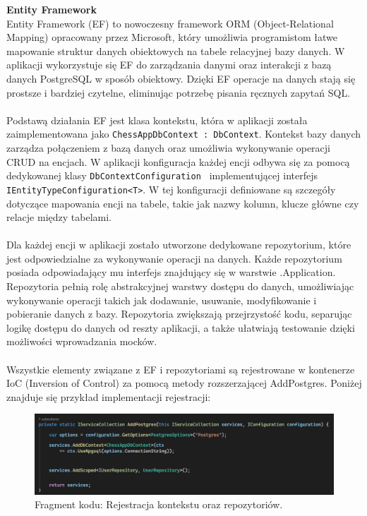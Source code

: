 \documentclass[12pt,a4paper]{article}
\begin{document}
\noindent \textbf{Entity Framework}\\
Entity Framework (EF) to nowoczesny framework ORM (Object-Relational Mapping) opracowany przez Microsoft, który umożliwia programistom łatwe mapowanie struktur danych obiektowych na tabele relacyjnej bazy danych. W aplikacji wykorzystuje się EF do zarządzania danymi oraz interakcji z bazą danych PostgreSQL w sposób obiektowy. Dzięki EF operacje na danych stają się prostsze i bardziej czytelne, eliminując potrzebę pisania ręcznych zapytań SQL.
\\\\
Podstawą działania EF jest klasa kontekstu, która w aplikacji została zaimplementowana jako \texttt{ChessAppDbContext : DbContext}. Kontekst bazy danych zarządza połączeniem z bazą danych oraz umożliwia wykonywanie operacji CRUD na encjach. W aplikacji konfiguracja każdej encji odbywa się za pomocą dedykowanej klasy \texttt{DbContextConfiguration } implementującej interfejs \texttt{IEntityTypeConfiguration<T>}. W tej konfiguracji definiowane są szczegóły dotyczące mapowania encji na tabele, takie jak nazwy kolumn, klucze główne czy relacje między tabelami.
\\\\
Dla każdej encji w aplikacji zostało utworzone dedykowane repozytorium, które jest odpowiedzialne za wykonywanie operacji na danych. Każde repozytorium posiada odpowiadający mu interfejs znajdujący się w warstwie .Application. Repozytoria pełnią rolę abstrakcyjnej warstwy dostępu do danych, umożliwiając wykonywanie operacji takich jak dodawanie, usuwanie, modyfikowanie i pobieranie danych z bazy. Repozytoria zwiększają przejrzystość kodu, separując logikę dostępu do danych od reszty aplikacji, a także ułatwiają testowanie dzięki możliwości wprowadzania mocków.
\\\\
Wszystkie elementy związane z EF i repozytoriami są rejestrowane w kontenerze IoC (Inversion of Control) za pomocą metody rozszerzającej AddPostgres. Poniżej znajduje się przykład implementacji rejestracji:

\vspace{0.5cm}
\begin{figure}[h!]
    \centering
    \includegraphics[width=1\textwidth]{images/ex_infra_extensions.png}
    \caption{Fragment kodu: Rejestracja kontekstu oraz repozytoriów.}
\end{figure}
\vspace{0.5cm}
\end{document}
